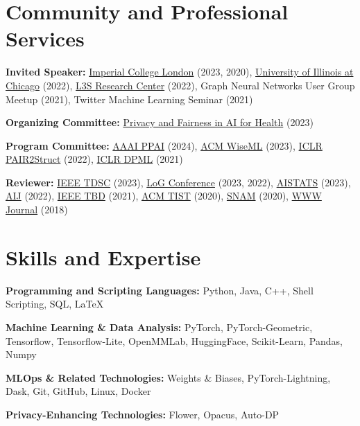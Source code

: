 \documentclass[11pt]{article}
\begin{document}
\section{Community and Professional Services}

\begin{outerlist}
  \item \textbf{Invited Speaker:}\quad
  \href{https://www.imperial.ac.uk/}{Imperial College London} (2023, 2020), \href{https://www.uic.edu/}{University of Illinois at Chicago} (2022), \href{https://www.l3s.de/}{L3S Research Center} (2022), Graph Neural Networks User Group Meetup (2021), Twitter Machine Learning Seminar (2021)

	\item \textbf{Organizing Committee:}\quad
	\href{https://priv-fair-ai-uk.github.io}{Privacy and Fairness in AI for Health} (2023)

	\item \textbf{Program Committee:}\quad
  \href{https://ppai-workshop.github.io/}{AAAI PPAI} (2024),
	\href{https://wisec2023.surrey.ac.uk/wiseml2023/}{ACM WiseML} (2023),
	\href{https://pair2struct-workshop.github.io/}{ICLR PAIR2Struct} (2022),
  \href{https://dp-ml.github.io/2021-workshop-ICLR/}{ICLR DPML} (2021)

	\item \textbf{Reviewer:}\quad
	\href{https://ieeexplore.ieee.org/xpl/aboutJournal.jsp?punumber=8858}{IEEE TDSC} (2023),
	\href{https://logconference.org/}{LoG Conference} (2023, 2022),
  \href{http://aistats.org/aistats2023/}{AISTATS} (2023),
	\href{https://www.journals.elsevier.com/artificial-intelligence}{AIJ} (2022),
	\href{https://ieeexplore.ieee.org/xpl/RecentIssue.jsp?punumber=6687317}{IEEE TBD} (2021),
	\href{https://dl.acm.org/journal/tist}{ACM TIST} (2020),
	\href{https://www.springer.com/journal/13278}{SNAM} (2020),
	\href{https://www.springer.com/journal/11280}{WWW Journal} (2018)

\end{outerlist}

\vspace{1cm}
\section{Skills and Expertise}

\begin{outerlist}
	\item \textbf{Programming and Scripting Languages:}\quad
	{Python, Java, C++, Shell Scripting, SQL, LaTeX}

	\item \textbf{Machine Learning \& Data Analysis:}\quad
	{PyTorch, PyTorch-Geometric, Tensorflow, Tensorflow-Lite, OpenMMLab, HuggingFace, Scikit-Learn, Pandas, Numpy}

	\item \textbf{MLOps \& Related Technologies:}\quad
	{Weights \& Biases, PyTorch-Lightning, Dask, Git, GitHub, Linux, Docker}

	\item \textbf{Privacy-Enhancing Technologies:}\quad
	{Flower, Opacus, Auto-DP}

\end{outerlist}
\end{document}
